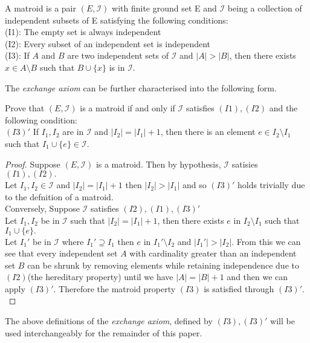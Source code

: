 \documentclass[../main.tex]{subfiles}
\begin{document}
\begin{defn}
A matroid is a pair $(E,\mathcal{I})$ with finite ground set E and $\mathcal{I}$ being a collection of independent subsets of E satisfying the following conditions:\\
\noindent (I1): The empty set is always independent\\
\noindent (I2): Every subset of an independent set is independent\\
\noindent (I3): If $ A $ and $ B $ are two independent sets of $\mathcal{I}$ and $|A|>|B|$, then there exists $x \in A \setminus B$ such that $B \cup \{ x \}$ is in $\mathcal{I}.$
\end{defn}
The \textit{exchange axiom} can be further characterised into the following form.
\begin{lem}
Prove that $(E,\mathcal{I})$ is a matroid if and only if $\mathcal{I}$ satisfies $(I1), (I2)$ and the following condition:\\
\noindent $(I3)'$ If $I_1,I_2$ are in $\mathcal{I}$ and $|I_2|=|I_1|+1$, then there is an element $e \in I_2 \setminus I_1$ such that $I_1 \cup \{e\} \in \mathcal{I}.$
\end{lem}
\begin{proof}
Suppose $(E,\mathcal{I})$ is a matroid. Then by hypothesis, $\mathcal{I}$ satisies $(I1),(I2).$\\
\noindent Let $I_1,I_2 \in \mathcal{I}$ and $|I_2|=|I_1|+1$ then $|I_2|>|I_1|$ and so $(I3)'$ holds trivially due to the defnition of a matroid.\\
Conversely, Suppose $\mathcal{I}$ satisfies $(I2),(I1),(I3)'$\\
Let $I_1,I_2$ be in $\mathcal{I}$ such that $|I_2|=|I_1|+1$, then there exists $e$ in $I_2 \setminus I_1$ such that $I_1 \cup \{e\}.$\\
Let $I_1'$ be in $\mathcal{I}$ where $I_1' \supseteq I_1$ then $e$ in $I_1' \setminus I_2$ and $|I_1'|>|I_2|.$ From this we can see that every independent set $A$ with cardinality greater than an independent set $B$ can be shrunk by removing elements while retaining independence due to $(I2)$(the hereditary property) until we have $|A|=|B|+1$ and then we can apply $(I3)'.$ Therefore the matroid property $(I3)$ is satisfied through $(I3)'.$
\end{proof}

\begin{note}
The above definitions of the \textit{exchange axiom}, defined by $(I3), (I3)'$ will be used interchangeably for the remainder of this paper.
\end{note}
\end{document}
